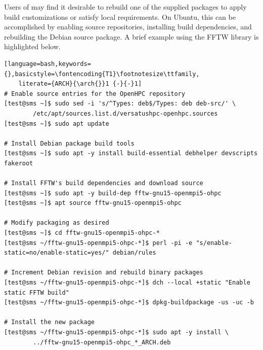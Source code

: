 Users of \OHPC{} may find it desirable to rebuild one of the supplied packages
to apply build customizations or satisfy local requirements. On Ubuntu, this can
be accomplished by enabling source repositories, installing build dependencies,
and rebuilding the Debian source package. A brief example using the FFTW library
is highlighted below.

\begin{lstlisting}[language=bash,keywords={},basicstyle=\fontencoding{T1}\footnotesize\ttfamily,
    literate={ARCH}{\arch{}}1 {-}{-}1]
# Enable source entries for the OpenHPC repository
[test@sms ~]$ sudo sed -i 's/^Types: deb$/Types: deb deb-src/' \
        /etc/apt/sources.list.d/versatushpc-openhpc.sources
[test@sms ~]$ sudo apt update

# Install Debian package build tools
[test@sms ~]$ sudo apt -y install build-essential debhelper devscripts fakeroot

# Install FFTW's build dependencies and download source
[test@sms ~]$ sudo apt -y build-dep fftw-gnu15-openmpi5-ohpc
[test@sms ~]$ apt source fftw-gnu15-openmpi5-ohpc

# Modify packaging as desired
[test@sms ~]$ cd fftw-gnu15-openmpi5-ohpc-*
[test@sms ~/fftw-gnu15-openmpi5-ohpc-*]$ perl -pi -e "s/enable-static=no/enable-static=yes/" debian/rules

# Increment Debian revision and rebuild binary packages
[test@sms ~/fftw-gnu15-openmpi5-ohpc-*]$ dch --local +static "Enable static FFTW build"
[test@sms ~/fftw-gnu15-openmpi5-ohpc-*]$ dpkg-buildpackage -us -uc -b

# Install the new package
[test@sms ~/fftw-gnu15-openmpi5-ohpc-*]$ sudo apt -y install \
        ../fftw-gnu15-openmpi5-ohpc_*_ARCH.deb
\end{lstlisting}
